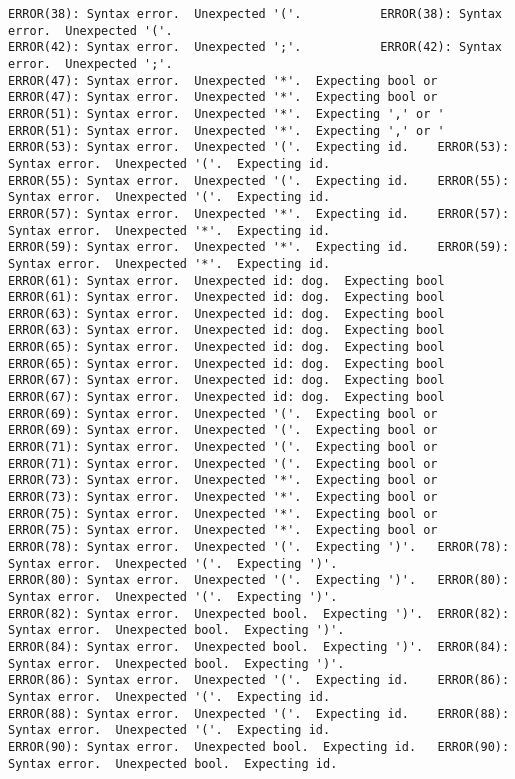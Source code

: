 \documentclass[12pt]{book}
\begin{document}
\begin{lstlisting}
ERROR(38): Syntax error.  Unexpected '('.			ERROR(38): Syntax error.  Unexpected '('.
ERROR(42): Syntax error.  Unexpected ';'.			ERROR(42): Syntax error.  Unexpected ';'.
ERROR(47): Syntax error.  Unexpected '*'.  Expecting bool or 	ERROR(47): Syntax error.  Unexpected '*'.  Expecting bool or 
ERROR(51): Syntax error.  Unexpected '*'.  Expecting ',' or '	ERROR(51): Syntax error.  Unexpected '*'.  Expecting ',' or '
ERROR(53): Syntax error.  Unexpected '('.  Expecting id.	ERROR(53): Syntax error.  Unexpected '('.  Expecting id.
ERROR(55): Syntax error.  Unexpected '('.  Expecting id.	ERROR(55): Syntax error.  Unexpected '('.  Expecting id.
ERROR(57): Syntax error.  Unexpected '*'.  Expecting id.	ERROR(57): Syntax error.  Unexpected '*'.  Expecting id.
ERROR(59): Syntax error.  Unexpected '*'.  Expecting id.	ERROR(59): Syntax error.  Unexpected '*'.  Expecting id.
ERROR(61): Syntax error.  Unexpected id: dog.  Expecting bool	ERROR(61): Syntax error.  Unexpected id: dog.  Expecting bool
ERROR(63): Syntax error.  Unexpected id: dog.  Expecting bool	ERROR(63): Syntax error.  Unexpected id: dog.  Expecting bool
ERROR(65): Syntax error.  Unexpected id: dog.  Expecting bool	ERROR(65): Syntax error.  Unexpected id: dog.  Expecting bool
ERROR(67): Syntax error.  Unexpected id: dog.  Expecting bool	ERROR(67): Syntax error.  Unexpected id: dog.  Expecting bool
ERROR(69): Syntax error.  Unexpected '('.  Expecting bool or 	ERROR(69): Syntax error.  Unexpected '('.  Expecting bool or 
ERROR(71): Syntax error.  Unexpected '('.  Expecting bool or 	ERROR(71): Syntax error.  Unexpected '('.  Expecting bool or 
ERROR(73): Syntax error.  Unexpected '*'.  Expecting bool or 	ERROR(73): Syntax error.  Unexpected '*'.  Expecting bool or 
ERROR(75): Syntax error.  Unexpected '*'.  Expecting bool or 	ERROR(75): Syntax error.  Unexpected '*'.  Expecting bool or 
ERROR(78): Syntax error.  Unexpected '('.  Expecting ')'.	ERROR(78): Syntax error.  Unexpected '('.  Expecting ')'.
ERROR(80): Syntax error.  Unexpected '('.  Expecting ')'.	ERROR(80): Syntax error.  Unexpected '('.  Expecting ')'.
ERROR(82): Syntax error.  Unexpected bool.  Expecting ')'.	ERROR(82): Syntax error.  Unexpected bool.  Expecting ')'.
ERROR(84): Syntax error.  Unexpected bool.  Expecting ')'.	ERROR(84): Syntax error.  Unexpected bool.  Expecting ')'.
ERROR(86): Syntax error.  Unexpected '('.  Expecting id.	ERROR(86): Syntax error.  Unexpected '('.  Expecting id.
ERROR(88): Syntax error.  Unexpected '('.  Expecting id.	ERROR(88): Syntax error.  Unexpected '('.  Expecting id.
ERROR(90): Syntax error.  Unexpected bool.  Expecting id.	ERROR(90): Syntax error.  Unexpected bool.  Expecting id.

\end{lstlisting}
\end{document}
